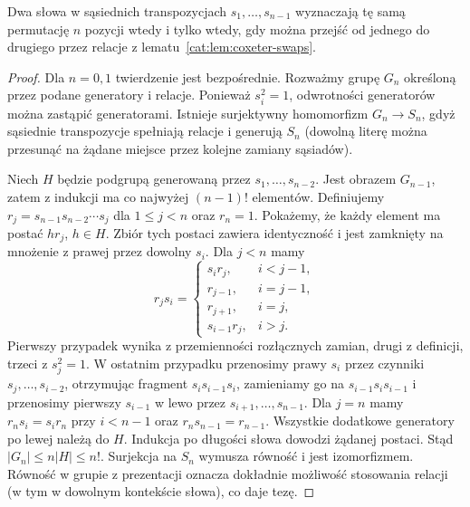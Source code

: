 \begin{lemat}\label{cat:lem:symmetric-presentation}
Dwa słowa w sąsiednich transpozycjach $s_1,\ldots,s_{n-1}$ wyznaczają tę samą permutację $n$ pozycji wtedy i tylko wtedy, gdy można przejść od jednego do drugiego przez relacje z lematu~\ref{cat:lem:coxeter-swaps}.
\end{lemat}
\begin{proof}
Dla $n=0,1$ twierdzenie jest bezpośrednie. Rozważmy grupę $G_n$ określoną przez podane generatory i relacje. Ponieważ $s_i^2=1$, odwrotności generatorów można zastąpić generatorami. Istnieje surjektywny homomorfizm $G_n\to S_n$, gdyż sąsiednie transpozycje spełniają relacje i generują $S_n$ (dowolną literę można przesunąć na żądane miejsce przez kolejne zamiany sąsiadów).

Niech $H$ będzie podgrupą generowaną przez $s_1,\ldots,s_{n-2}$. Jest obrazem $G_{n-1}$, zatem z indukcji ma co najwyżej $(n-1)!$ elementów. Definiujemy $r_j=s_{n-1}s_{n-2}\cdots s_j$ dla $1\le j<n$ oraz $r_n=1$. Pokażemy, że każdy element ma postać $hr_j$, $h\in H$. Zbiór tych postaci zawiera identyczność i jest zamknięty na mnożenie z prawej przez dowolny $s_i$. Dla $j<n$ mamy
\[
r_js_i=
\begin{cases}
s_i r_j,&i<j-1,\\
r_{j-1},&i=j-1,\\
r_{j+1},&i=j,\\
s_{i-1}r_j,&i>j.
\end{cases}
\]
Pierwszy przypadek wynika z przemienności rozłącznych zamian, drugi z definicji, trzeci z $s_j^2=1$. W ostatnim przypadku przenosimy prawy $s_i$ przez czynniki $s_j,\ldots,s_{i-2}$, otrzymując fragment $s_i s_{i-1}s_i$, zamieniamy go na $s_{i-1}s_i s_{i-1}$ i przenosimy pierwszy $s_{i-1}$ w lewo przez $s_{i+1},\ldots,s_{n-1}$. Dla $j=n$ mamy $r_ns_i=s_i r_n$ przy $i<n-1$ oraz $r_ns_{n-1}=r_{n-1}$. Wszystkie dodatkowe generatory po lewej należą do $H$. Indukcja po długości słowa dowodzi żądanej postaci.
Stąd $|G_n|\le n|H|\le n!$. Surjekcja na $S_n$ wymusza równość i jest izomorfizmem. Równość w grupie z prezentacji oznacza dokładnie możliwość stosowania relacji (w tym w dowolnym kontekście słowa), co daje tezę.
\end{proof}

